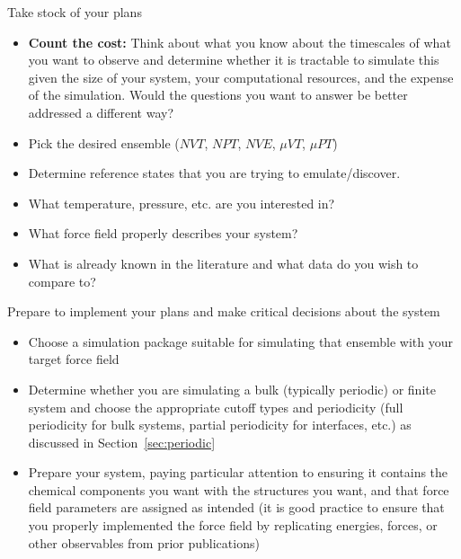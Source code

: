 \documentclass[9pt,bestpractices]{livecoms}
\begin{document}
\begin{Checklists*}[p!]

\begin{checklist}{Take stock of your plans}

\begin{itemize}
\item \textbf{Count the cost: } Think about what you know about the timescales of what you want to observe and determine whether it is tractable to simulate this given the size of your system, your computational resources, and the expense of the simulation. Would the questions you want to answer be better addressed a different way?
\item Pick the desired ensemble ($NVT$, $NPT$, $NVE$, $\mu VT$, $\mu PT$)
\item Determine reference states that you are trying to emulate/discover.
\item What temperature, pressure, etc. are you interested in?
\item What force field properly describes your system?
\item What is already known in the literature and what data do you wish to compare to?
\end{itemize}
\end{checklist}

\begin{checklist}{Prepare to implement your plans and make critical decisions about the system}

\begin{itemize}
\item Choose a simulation package suitable for simulating that ensemble with your target force field
\item Determine whether you are simulating a bulk (typically periodic) or finite system and choose the appropriate cutoff types and periodicity (full periodicity for bulk systems, partial periodicity for interfaces, etc.) as discussed in Section~\ref{sec:periodic}
\item Prepare your system, paying particular attention to ensuring it contains the chemical components you want with the structures you want, and that force field parameters are assigned as intended (it is good practice to ensure that you properly implemented the force field by replicating energies, forces, or other observables from prior publications)
\end{itemize}
\end{checklist}


\end{Checklists*}
\end{document}
